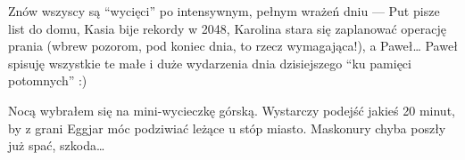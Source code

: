 
Znów wszyscy są “wycięci” po intensywnym, pełnym wrażeń dniu --- Put pisze list do domu, Kasia bije rekordy w 2048, Karolina stara się zaplanować operację prania (wbrew pozorom, pod koniec dnia, to rzecz wymagająca!), a Paweł… Paweł spisuję wszystkie te małe i duże wydarzenia dnia dzisiejszego “ku pamięci potomnych” :)

Nocą wybrałem się na mini-wycieczkę górską. Wystarczy podejść jakieś 20 minut, by z grani Eggjar móc podziwiać leżące u stóp miasto. Maskonury chyba poszły już spać, szkoda…